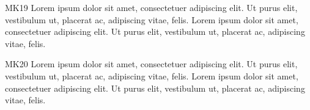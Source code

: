 \documentclass[twocolumn]{article}
\begin{document}
MK19 Lorem ipsum dolor sit amet, consectetuer adipiscing elit. Ut purus elit, vestibulum ut, placerat ac, adipiscing vitae, felis. Lorem ipsum dolor sit amet, consectetuer adipiscing elit. Ut purus elit, vestibulum ut, placerat ac, adipiscing vitae, felis.\par
{}MK20 Lorem ipsum dolor sit amet, consectetuer adipiscing elit. Ut purus elit, vestibulum ut, placerat ac, adipiscing vitae, felis. Lorem ipsum dolor sit amet, consectetuer adipiscing elit. Ut purus elit, vestibulum ut, placerat ac, adipiscing vitae, felis.\par
\end{document}
